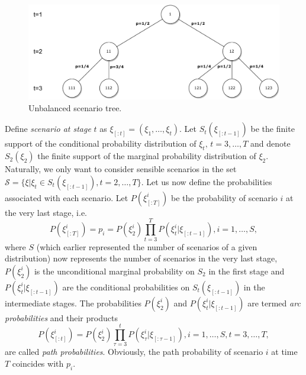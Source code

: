 \begin{figure}
  \includegraphics[width=\linewidth]{../img/scenario_tree_unbalanced.pdf}
  \caption{Unbalanced scenario tree.}
  \label{fig:unbalanced_scenario_tree}
\end{figure}

Define \textit{scenario at stage} $t$ as $\xi_{[:t]} = (\xi_1,\dots,\xi_t)$.
Let $S_t(\xi_{[:t-1]})$ be the finite support of the conditional probability distribution of $\xi_t, \, t=3,\dots,T$ and denote $S_2(\xi_{2})$ the finite support of the marginal probability distribution of $\xi_2$. Naturally, we only want to consider sensible scenarios in the set $\mathcal{S}=\{\xi|\xi_t \in S_t(\xi_{[:t-1]}), t=2,\dots,T\}$. Let us now define the probabilities associated with each scenario. Let $P(\xi_{[:T]}^i)$ be the probability of scenario $i$ at the very last stage, i.e.
\begin{equation}
P(\xi_{[:T]}^i)=p_i=P(\xi_2^i)\prod_{t=3}^{T}P(\xi_t^i|\xi_{[:t-1]}), i=1,\dots,S,
\end{equation}
where $S$ (which earlier represented the number of scenarios of a given distribution) now represents the number of scenarios in the very last stage, $P(\xi_2^i)$ is the unconditional marginal probability on $S_2$ in the first stage and $P(\xi_t^i|\xi_{[:t-1]})$ are the conditional probabilities on $S_t(\xi_{[:t-1]})$ in the intermediate stages. The probabilities $P(\xi_2^i)$ and $P(\xi_t^i|\xi_{[:t-1]})$ are termed \textit{arc probabilities} and their products
\begin{equation}
P(\xi_{[:t]}^i)=P(\xi_2^i)\prod_{\tau=3}^{t}P(\xi_\tau^i|\xi_{[:\tau-1]}), i=1,\dots,S, t=3,\dots,T,
\end{equation}
are called \textit{path probabilities}. Obviously, the path probability of scenario $i$ at time $T$ coincides with $p_i$. 	 

